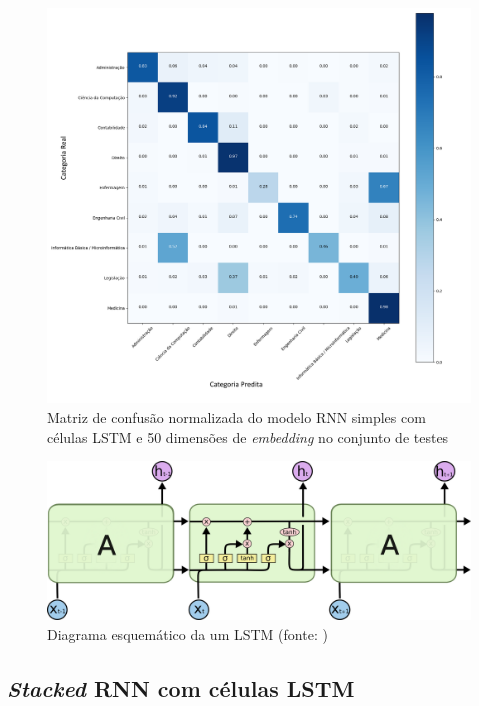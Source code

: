 \begin{figure}[!ht]
	\centering
	\includegraphics[width=1.0\textwidth]{figures/lstm_confusion.png}
	\caption{Matriz de confusão normalizada do modelo RNN simples com células LSTM e 50 dimensões de \textit{embedding} no conjunto de testes}
	\label{fig:LSTM_CONF}
\end{figure}

\begin{figure}[!ht]
	\centering
	\includegraphics[width=1.0\textwidth]{figures/LSTM3-chain.png}
	\caption{Diagrama esquemático da um LSTM (fonte: \cite{ColahLSTM})}
	\label{fig:LSTM}
\end{figure}

\subsection{\textit{Stacked} RNN com células LSTM}

